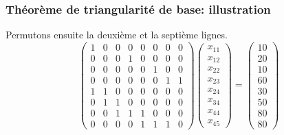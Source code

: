 \documentclass[usepdftitle=false]{beamer}
\begin{document}
\begin{frame}
\frametitle{Théorème de triangularité de base: illustration}

Permutons ensuite la deuxième et la septième lignes.
\[
\begin{pmatrix}
 1 & 0 & 0 & 0 & 0 & 0 & 0 & 0 \\
 0 & 0 & 0 & 1 & 0 & 0 & 0 & 0 \\
 0 & 0 & 0 & 0 & 0 & 1 & 0 & 0 \\
 0 & 0 & 0 & 0 & 0 & 0 & 1 & 1 \\
 1 & 1 & 0 & 0 & 0 & 0 & 0 & 0 \\
 0 & 1 & 1 & 0 & 0 & 0 & 0 & 0 \\
 0 & 0 & 1 & 1 & 1 & 0 & 0 & 0 \\
 0 & 0 & 0 & 0 & 1 & 1 & 1 & 0
\end{pmatrix}
\begin{pmatrix}
x_{11} \\
x_{12} \\
x_{22} \\
x_{23} \\
x_{24} \\
x_{34} \\
x_{44} \\
x_{45}
\end{pmatrix}
=
\begin{pmatrix}
10 \\
20 \\
10 \\
60 \\
30 \\
50 \\
80 \\
80
\end{pmatrix}
\]

\end{frame}
\end{document}
